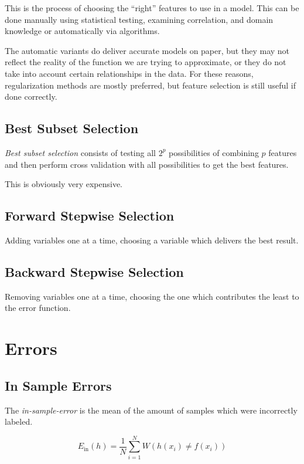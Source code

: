This is the process of choosing the ``right'' features to use in a model. This can be done manually using statistical
testing, examining correlation, and domain knowledge or automatically via algorithms.

The automatic variants do deliver accurate models on paper, but they may not reflect the reality of the function we are trying to
approximate, or they do not take into account certain relationships in the data. For these reasons, regularization methods are mostly preferred, but feature
selection is still useful if done correctly.

\subsection{Best Subset Selection}

\emph{Best subset selection} consists of testing all \(2^p\) possibilities of combining \(p\) features and then perform cross validation
with all possibilities to get the best features.

This is obviously very expensive.

\subsection{Forward Stepwise Selection}

Adding variables one at a time, choosing a variable which delivers the best result.

\subsection{Backward Stepwise Selection}

Removing variables one at a time, choosing the one which contributes the least to the error function.

\section{Errors}

\subsection{In Sample Errors}

The \emph{in-sample-error} is the mean of the amount of samples which were incorrectly labeled.

\[
	E_{\text{in}} (h) = \frac{1}{N} \sum_{i = 1}^{N} W(h(x_i) \neq f(x_i))
\]

